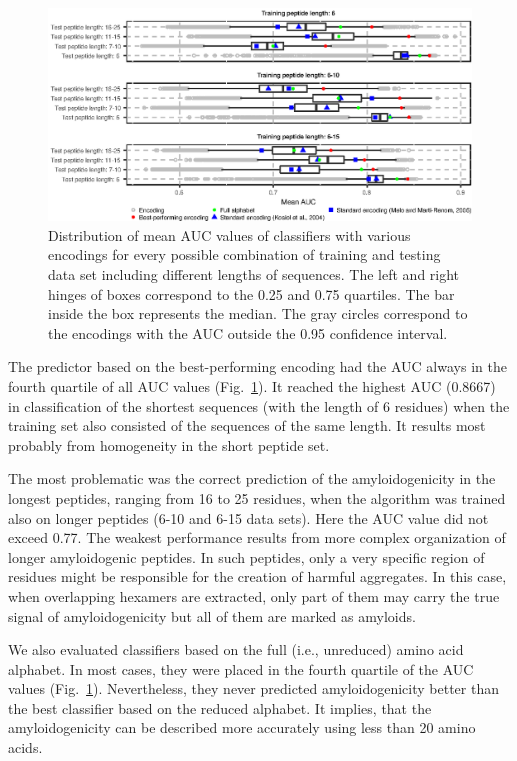 \documentclass[fleqn,10pt,twoside]{gcb15submission}
\begin{document}
\begin{figure}[h]
\centerline{\includegraphics{figures/AUC_boxplot.eps}}
\caption{Distribution of mean AUC values of classifiers with various encodings 
for every possible combination of training and testing data set including 
different lengths of sequences. The left and right hinges of boxes correspond 
to 
the 0.25 and 0.75 quartiles. The bar inside the box represents the median. The 
gray circles correspond to the encodings with the AUC outside the 0.95 
confidence interval. 
}\label{fig:AUC_boxplot}

\end{figure}

The predictor based on the best-performing encoding had the AUC always in the 
fourth quartile of all AUC values (Fig.~\ref{fig:AUC_boxplot}). It reached the 
highest AUC (0.8667) in classification of the shortest sequences (with the 
length of 6 residues) when the training set also consisted of the sequences of 
the same length. It results most probably from homogeneity in the short peptide 
set. 

  The most problematic was the correct prediction of the amyloidogenicity in the 
longest peptides, ranging from 16 to 25 residues, when the algorithm was trained 
also on longer peptides (6-10 and 6-15 data sets). Here the AUC value did not 
exceed 0.77. The weakest performance results from more complex organization of 
longer amyloidogenic peptides. In such peptides, only a very specific region of 
residues might be responsible for the creation of harmful aggregates. In this 
case, when overlapping hexamers are extracted, only part of them may carry the 
true signal of amyloidogenicity but all of them are marked as amyloids. 

  We also evaluated classifiers based on the full (i.e., unreduced) amino acid 
alphabet. In most cases, they were placed in the fourth quartile of the AUC 
values (Fig.~\ref{fig:AUC_boxplot}). Nevertheless, they never predicted 
amyloidogenicity better than the best classifier based on the reduced alphabet. 
It implies, that the amyloidogenicity can be described more accurately using less 
than 20 amino acids.
\end{document}
